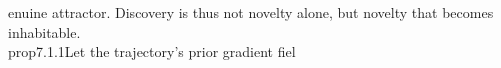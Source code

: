{{{{{enuine attractor. Discovery is thus not novelty alone, but novelty that becomes inhabitable.}\n\n\\prop{7.1.1}{Let the trajectory's prior gradient fiel}}}}}
